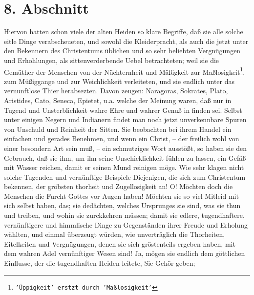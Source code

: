 \section{8. Abschnitt} \label{kap14_ab8}

Hiervon hatten schon viele der alten Heiden so klare Begriffe, daß sie alle
solche eitle Dinge verabscheueten, und sowohl die Kleiderpracht, als auch die
jetzt unter den Bekennern des Christentums üblichen und so sehr beliebten
Vergnügungen und Erhohlungen, als sittenverderbende Uebel betrachteten; weil sie
die Gemüther der Menschen von der Nüchternheit und Mäßigkeit zur Maßlosigkeit\footnote{\texttt{'Üppigkeit' erstzt durch 'Maßlosigkeit'}}, zum
Müßiggange und zur Weichlichkeit verleiteten, und sie endlich unter das
vernunftlose Thier herabsezten. Davon zeugen: Naragoras, Sokrates, Plato,
Aristides, Cato, Seneca, Epietet, u.a. welche der Meinung waren, daß nur in
Tugend und Unsterblichkeit wahre Ehre und wahrer Genuß in finden sei. Selbst
unter einigen Negern und Indianern findet man noch jetzt unverkennbare Spuren
von Unschuld und Reinheit der Sitten. Sie beobachten bei ihrem Handel ein
einfachen und gerades Benehmen, und wenn ein Christ, -- der freilich wohl von
einer besondern Art sein muß, -- ein schmutziges Wort ausstößt, so haben sie den
Gebrauch, daß sie ihm, um ihn seine Unschicklichkeit fühlen zu lassen, ein
Gefäß mit Wasser reichen, damit er seinen Mund reinigen möge. Wie sehr klagen
nicht solche Tugenden und vernünftige Beispiele Diejenigen, die sich zum
Christentum bekennen, der gröbsten thorheit und Zugellosigkeit an! O! Möchten
doch die Menschen die Furcht Gottes vor Augen haben! Möchten sie so viel Mitleid
mit sich selbst haben, das; sie dedächten, welches Ursprunges sie sind, was sie
thun und treiben, und wohin sie zurckkehren müssen; damit sie edlere,
tugendhaftere, vernünftigere und himmlische Dinge zu Gegenständen ihrer Freude
und Erholung wählten, und einmal überzeugt würden, wie unverträglich die
Thorheiten, Eitelkeiten und Vergnügungen, denen sie sich gröstenteils ergeben
haben, mit dem wahren Adel vernünftiger Wesen sind! Ja, mögen sie endlich dem
göttlichen Einflusse, der die tugendhaften Heiden leitete, Sie Gehör geben;
